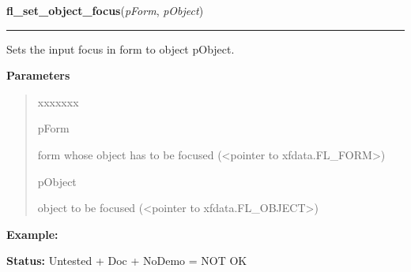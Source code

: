\hspace{.8\funcindent}\begin{boxedminipage}{\funcwidth}

    \raggedright \textbf{fl\_set\_object\_focus}(\textit{pForm}, \textit{pObject})

    \vspace{-1.5ex}

    \rule{\textwidth}{0.5\fboxrule}
\setlength{\parskip}{2ex}
    Sets the input focus in form to object pObject.

\setlength{\parskip}{1ex}
      \textbf{Parameters}
      \vspace{-1ex}

      \begin{quote}
        \begin{Ventry}{xxxxxxx}

          \item[pForm]

          form whose object has to be focused ({\textless}pointer to 
          xfdata.FL\_FORM{\textgreater})

          \item[pObject]

          object to be focused ({\textless}pointer to 
          xfdata.FL\_OBJECT{\textgreater})

        \end{Ventry}

      \end{quote}

\textbf{Example:} 

\textbf{Status:} Untested + Doc + NoDemo = NOT OK



    \end{boxedminipage}

    \label{xformslib:library:fl_get_focus_object}

    \vspace{0.5ex}

